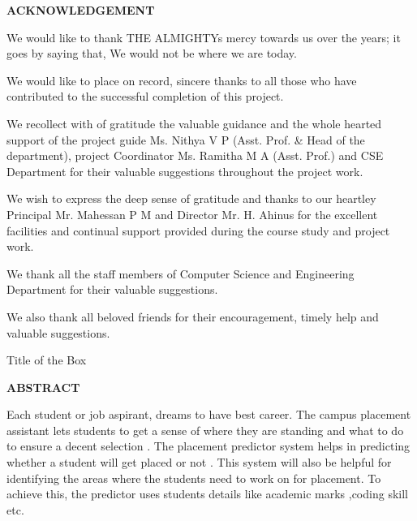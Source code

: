 \documentclass[12pt]{article}
\begin{document}
\newpage



\vspace*{50px}
\begin{center}\LARGE\bf{ACKNOWLEDGEMENT}\end{center}
\vspace{10px}
\thispagestyle{empty}

We would like to thank THE ALMIGHTYs mercy towards us over the years; it goes
by saying that, We would not be where we are today.

We would like to place on record, sincere thanks to all those who have contributed
to the successful completion of this project.

We recollect with of gratitude the valuable guidance and the whole hearted support
of the project guide Ms. Nithya V P (Asst. Prof. \&  Head of the department),  project Coordinator Ms. Ramitha M A (Asst. Prof.) and CSE Department for their valuable suggestions throughout the
project work.

We wish to express the deep sense of gratitude and thanks to our heartley Principal Mr.
Mahessan P M and Director Mr. H. Ahinus for the excellent facilities and continual
support provided during the course study and project work.

We thank all the staff members of Computer Science and Engineering Department
for their valuable suggestions.

We also thank all beloved friends for their encouragement, timely help and valuable suggestions.


\newpage
\begin{boxed}{Title of the Box}
\vspace*{50px}
\begin{center} \LARGE\bf{ABSTRACT} \end{center}
               
\vspace{30px}
Each student or job aspirant, dreams to have best career. The
campus placement assistant lets students to get a sense of
where they are standing and what to do to ensure a decent
selection .
The placement predictor system helps in predicting whether a
student will get placed or not .
 This system will also be helpful for identifying the areas where
the students need to work on for placement.
 To achieve this, the predictor uses students details like
academic marks ,coding skill etc. 

\newpage
\tableofcontents
\clearpage
\listoffigures

\clearpage


\end{boxed}
\end{document}
